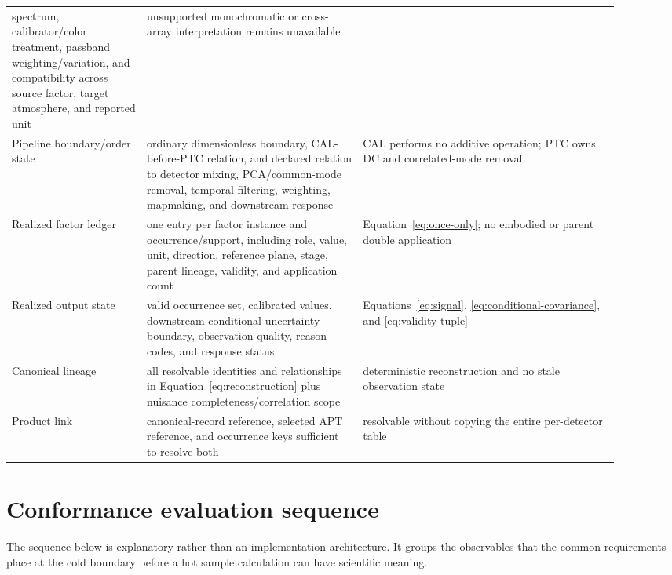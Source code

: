 \documentclass[10pt]{article}
\begin{document}
\begin{longtable}{L{0.20\linewidth}L{0.32\linewidth}L{0.38\linewidth}}
spectrum, calibrator/color treatment, passband weighting/variation, and
compatibility across source factor, target atmosphere, and reported unit &
unsupported monochromatic or cross-array interpretation remains unavailable \\
Pipeline boundary/order state & ordinary dimensionless  boundary,
CAL-before-PTC relation, and declared relation to detector mixing,
PCA/common-mode removal, temporal filtering, weighting, mapmaking, and
downstream response & CAL performs no additive operation; PTC owns DC and
correlated-mode removal \\
Realized factor ledger & one entry per factor instance and occurrence/support,
including role, value, unit, direction, reference plane, stage, parent
lineage, validity, and application count & Equation~\eqref{eq:once-only}; no
embodied or parent double application \\
Realized output state & valid occurrence set, calibrated values, downstream
conditional-uncertainty boundary, observation quality, reason codes, and response
status & Equations~\eqref{eq:signal}, \eqref{eq:conditional-covariance}, and
\eqref{eq:validity-tuple} \\
Canonical lineage & all resolvable identities and relationships in
Equation~\eqref{eq:reconstruction} plus nuisance completeness/correlation
scope & deterministic reconstruction and no stale observation state \\
Product link & canonical-record reference, selected APT reference, and
occurrence keys sufficient to resolve both & resolvable without copying the
entire per-detector table \\
\bottomrule
\end{longtable}

\section{Conformance evaluation sequence}
\label{sec:eng-sequence}

The sequence below is explanatory rather than an implementation architecture.
It groups the observables that the common requirements place at the cold
boundary before a hot sample calculation can have scientific meaning.
\end{document}
